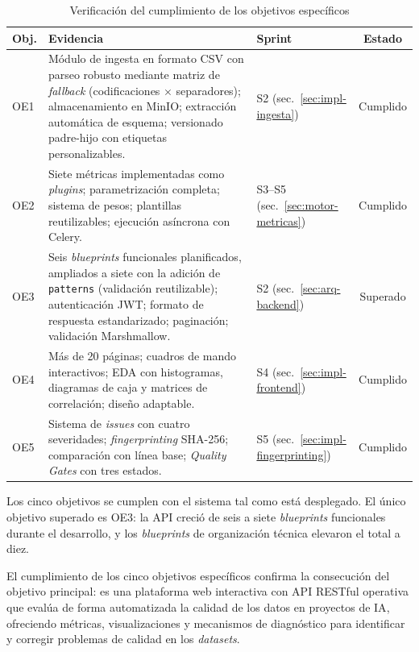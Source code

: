\begin{table}[htbp]
  \centering
  \caption{Verificación del cumplimiento de los objetivos específicos}
  \label{tab:cumplimiento}
  \begin{tabularx}{\textwidth}{l X l c}
    \toprule
    \textbf{Obj.} & \textbf{Evidencia} & \textbf{Sprint} & \textbf{Estado} \\
    \midrule
    OE1 & Módulo de ingesta en formato \ac{CSV} con parseo robusto mediante
      matriz de \emph{fallback} (codificaciones $\times$ separadores);
      almacenamiento en MinIO; extracción automática de esquema;
      versionado padre-hijo con etiquetas personalizables.
      & S2 (sec.~\ref{sec:impl-ingesta}) & Cumplido \\
    OE2 & Siete métricas implementadas como \emph{plugins}; parametrización
      completa; sistema de pesos; plantillas reutilizables; ejecución
      asíncrona con Celery. & S3--S5 (sec.~\ref{sec:motor-metricas}) & Cumplido \\
    OE3 & Seis \emph{blueprints} funcionales planificados, ampliados a
      siete con la adición de \texttt{patterns} (validación
      reutilizable); autenticación \ac{JWT}; formato de respuesta
      estandarizado; paginación; validación Marshmallow.
      & S2 (sec.~\ref{sec:arq-backend}) & Superado \\
    OE4 & Más de 20 páginas; cuadros de mando interactivos; \ac{EDA} con
      histogramas, diagramas de caja y matrices de correlación; diseño
      adaptable. & S4 (sec.~\ref{sec:impl-frontend}) & Cumplido \\
    OE5 & Sistema de \emph{issues} con cuatro severidades;
      \emph{fingerprinting} \ac{SHA}-256; comparación con línea base;
      \emph{Quality Gates} con tres estados.
      & S5 (sec.~\ref{sec:impl-fingerprinting}) & Cumplido \\
    \bottomrule
  \end{tabularx}
\end{table}

Los cinco objetivos se cumplen con el sistema tal como está desplegado.  El
único objetivo superado es OE3: la \ac{API} creció de seis a siete
\emph{blueprints} funcionales durante el desarrollo, y los \emph{blueprints}
de organización técnica elevaron el total a diez.

El cumplimiento de los cinco objetivos específicos confirma la consecución del
objetivo principal: \dataqual es una plataforma web interactiva con \ac{API}
\ac{REST}ful operativa que evalúa de forma automatizada la calidad de los datos
en proyectos de \ac{IA}, ofreciendo métricas, visualizaciones y mecanismos de
diagnóstico para identificar y corregir problemas de calidad en los
\emph{datasets}.

